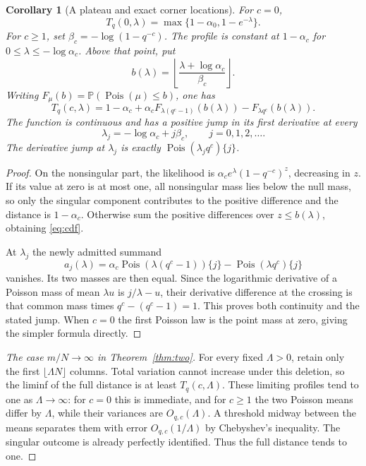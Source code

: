 \documentclass[11pt]{article}
\newtheorem{corollary}[theorem]{Corollary}
\theoremstyle{remark}\newtheorem{remark}[theorem]{Remark}
\newcommand{\Pp}{\mathbb P}
\newcommand{\Poi}{\operatorname{Pois}}
\begin{document}
\begin{corollary}[A plateau and exact corner locations]\label{cor:corners}
For $c=0$,
\[
 T_q(0,\lambda)=\max\{1-\alpha_0,1-e^{-\lambda}\}.
\]
For $c\ge1$, set $\beta_c=-\log(1-q^{-c})$. The profile is constant at $1-\alpha_c$ for $0\le\lambda\le-\log\alpha_c$. Above that point, put
\[
 b(\lambda)=\left\lfloor\frac{\lambda+\log\alpha_c}{\beta_c}\right\rfloor.
\]
Writing $F_\mu(b)=\Pp(\Poi(\mu)\le b)$, one has
\begin{equation}\label{eq:cdf}
 T_q(c,\lambda)=1-\alpha_c+
 \alpha_cF_{\lambda(q^c-1)}(b(\lambda))-F_{\lambda q^c}(b(\lambda)).
\end{equation}
The function is continuous and has a positive jump in its first derivative at every
\[
 \lambda_j=-\log\alpha_c+j\beta_c,\qquad j=0,1,2,\ldots.
\]
The derivative jump at $\lambda_j$ is exactly $\Poi(\lambda_jq^c)\{j\}$.
\end{corollary}

\begin{proof}
On the nonsingular part, the likelihood is $\alpha_ce^\lambda(1-q^{-c})^z$, decreasing in $z$. If its value at zero is at most one, all nonsingular mass lies below the null mass, so only the singular component contributes to the positive difference and the distance is $1-\alpha_c$. Otherwise sum the positive differences over $z\le b(\lambda)$, obtaining \eqref{eq:cdf}.

At $\lambda_j$ the newly admitted summand
\[
 a_j(\lambda)=\alpha_c\Poi(\lambda(q^c-1))\{j\}-\Poi(\lambda q^c)\{j\}
\]
vanishes. Its two masses are then equal. Since the logarithmic derivative of a Poisson mass of mean $\lambda u$ is $j/\lambda-u$, their derivative difference at the crossing is that common mass times $q^c-(q^c-1)=1$. This proves both continuity and the stated jump. When $c=0$ the first Poisson law is the point mass at zero, giving the simpler formula directly.
\end{proof}

\begin{proof}[The case $m/N\to\infty$ in Theorem~\ref{thm:two}]
For every fixed $\Lambda>0$, retain only the first $\lfloor\Lambda N\rfloor$ columns. Total variation cannot increase under this deletion, so the liminf of the full distance is at least $T_q(c,\Lambda)$. These limiting profiles tend to one as $\Lambda\to\infty$: for $c=0$ this is immediate, and for $c\ge1$ the two Poisson means differ by $\Lambda$, while their variances are $O_{q,c}(\Lambda)$. A threshold midway between the means separates them with error $O_{q,c}(1/\Lambda)$ by Chebyshev's inequality. The singular outcome is already perfectly identified. Thus the full distance tends to one.
\end{proof}
\end{document}

